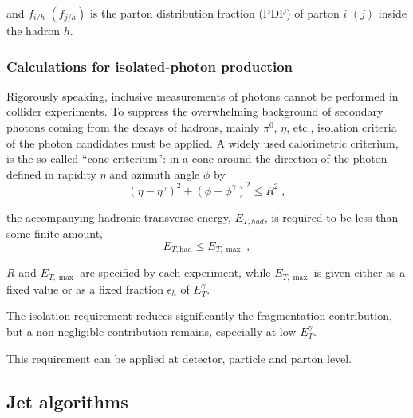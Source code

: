 \documentclass[12pt, twoside]{article}
\numberwithin{equation}{section}
\numberwithin{figure}{section}
\begin{document}
and $f_{i/h}$ $(f_{j/h})$ is the parton distribution fraction (PDF) of parton $i$ $(j)$ inside the hadron $h$.

\subsubsection{Calculations for isolated-photon production}
\label{subsubsec:CalculationsForIsolatedPhotonProduction}

Rigorously speaking, inclusive measurements of photons cannot be performed in collider experiments. To suppress the overwhelming background of secondary photons coming from the decays of hadrons, mainly $\pi^{0}$, $\eta$, etc., isolation criteria of the photon candidates must be applied. A widely used calorimetric criterium, is the so-called ``cone criterium'': in a cone around the direction of the photon defined in rapidity $\eta$ and azimuth angle $\phi$ by
\begin{equation}    \label{eq:ConeCriterium}
    \left(\eta - \eta^{\gamma} \right)^{2} + \left(\phi - \phi^{\gamma} \right)^{2} \leq R^{2} \;,
\end{equation}

the accompanying hadronic transverse energy, $E_{T,had}$, is required to be less than some finite amount,
\begin{equation}    \label{eq:EnergyEtISOCondition}
    E_{T,\text{had}} \leq E_{T,\max} \;,
\end{equation}

$R$ and $E_{T,\max}$ are specified by each experiment, while $E_{T,\max}$ is given either as a fixed value or as a fixed fraction $\epsilon_{h}$ of $E^{\gamma}_{T}$.

The isolation requirement reduces significantly the fragmentation contribution, but a non-negligible contribution remains, especially at low $E^{\gamma}_{T}$.

This requirement can be applied at detector, particle and parton level.

\subsection{Jet algorithms}
\label{subsec:JetAlgorithms}
\end{document}
